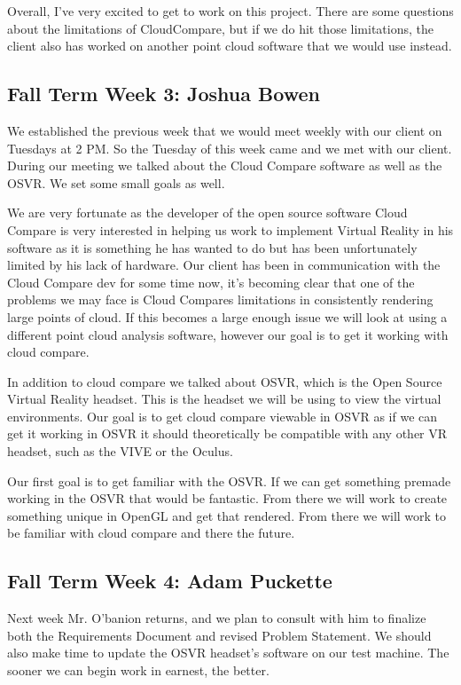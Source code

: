 \documentclass[draftclsnofoot,onecolumn]{IEEEtran}
\begin{document}
Overall, I've very excited to get to work on this project. 
There are some questions about the limitations of CloudCompare, but if we do hit those limitations, the client also has worked on another point cloud software that we would use instead.

\subsection{Fall Term Week 3: Joshua Bowen}

We established the previous week that we would meet weekly with our client on Tuesdays at 2 PM. 
So the Tuesday of this week came and we met with our client. During our meeting we talked about the Cloud Compare software as well as the OSVR. 
We set some small goals as well.

We are very fortunate as the developer of the open source software Cloud Compare is very interested in helping us work to implement Virtual Reality in his software as it is something he has wanted to do but has been unfortunately limited by his lack of hardware. 
Our client has been in communication with the Cloud Compare dev for some time now, it's becoming clear that one of the problems we may face is Cloud Compares limitations in consistently rendering large points of cloud. 
If this becomes a large enough issue we will look at using a different point cloud analysis software, however our goal is to get it working with cloud compare.

In addition to cloud compare we talked about OSVR, which is the Open Source Virtual Reality headset. 
This is the headset we will be using to view the virtual environments. Our goal is to get cloud compare viewable in OSVR as if we can get it working in OSVR it should theoretically be compatible with any other VR headset, such as the VIVE or the Oculus.

Our first goal is to get familiar with the OSVR. 
If we can get something premade working in the OSVR that would be fantastic. 
From there we will work to create something unique in OpenGL and get that rendered. From there we will work to be familiar with cloud compare and there the future.

\subsection{Fall Term Week 4: Adam Puckette}

Next week Mr. O'banion returns, and we plan to consult with him to finalize both the Requirements Document and revised Problem Statement. We should also make time to update the OSVR headset's software on our test machine. The sooner we can begin work in earnest, the better.
\end{document}
